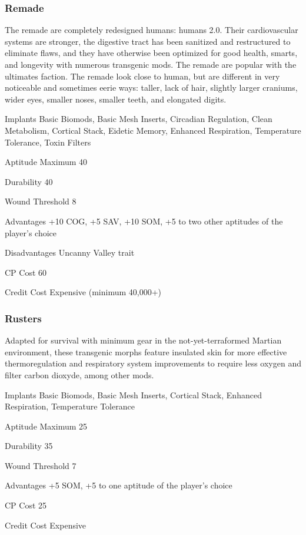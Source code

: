 \subsubsection{Remade}
\label{sec:starting-remade}

The remade are completely redesigned humans: humans 2.0. Their cardiovascular systems are stronger, the digestive tract has been sanitized and restructured to eliminate flaws, and they have otherwise been optimized for good health, smarts, and longevity with numerous transgenic mods. The remade are popular with the ultimates faction. The remade look close to human, but are different in very noticeable and sometimes eerie ways: taller, lack of hair, slightly larger craniums, wider eyes, smaller noses, smaller teeth, and elongated digits.

\begin{description*}
\item[Implants] Basic Biomods, Basic Mesh Inserts, Circadian Regulation, Clean Metabolism, Cortical Stack, Eidetic Memory, Enhanced Respiration, Temperature Tolerance, Toxin Filters
\item[Aptitude Maximum] 40 
\item[Durability] 40 
\item[Wound Threshold] 8 
\item[Advantages] +10 COG, +5 SAV, +10 SOM, +5 to two other aptitudes of the player’s choice
\item[Disadvantages] Uncanny Valley trait 
\item[CP Cost] 60 
\item[Credit Cost] Expensive (minimum 40,000+) 
\end{description*}

\subsubsection{Rusters}
\label{sec:starting-rusters}

Adapted for survival with minimum gear in the not-yet-terraformed Martian environment, these transgenic morphs feature insulated skin for more effective thermoregulation and respiratory system improvements to require less oxygen and filter carbon dioxyde, among other mods.

\begin{description*}
\item[Implants] Basic Biomods, Basic Mesh Inserts, Cortical Stack, Enhanced Respiration, Temperature Tolerance
\item[Aptitude Maximum] 25 
\item[Durability] 35 
\item[Wound Threshold] 7 
\item[Advantages] +5 SOM, +5 to one aptitude of the player’s choice 
\item[CP Cost] 25 
\item[Credit Cost] Expensive 
\end{description*}

